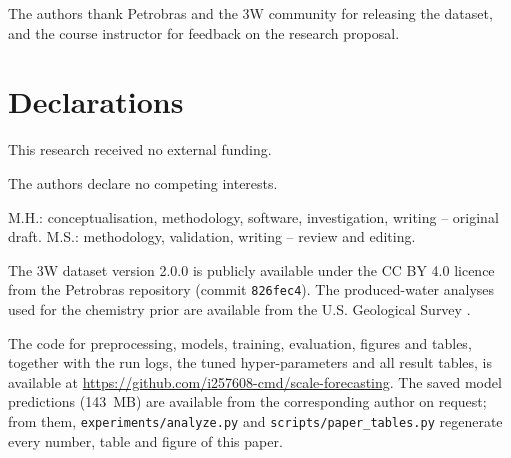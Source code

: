 The authors thank Petrobras and the 3W community for releasing the dataset, and the course instructor for
feedback on the research proposal.

\section*{Declarations}\label{sec:declarations}

This research received no external funding.

The authors declare no competing interests.

M.H.: conceptualisation, methodology, software, investigation, writing -- original draft. M.S.: methodology,
validation, writing -- review and editing.

The 3W dataset version 2.0.0 is publicly available under the CC BY 4.0 licence from the Petrobras repository
\citep{petrobras3w} (commit \texttt{826fec4}). The produced-water analyses used for the chemistry prior are
available from the U.S. Geological Survey \citep{blondes2023}.

The code for preprocessing, models, training, evaluation, figures and tables, together with the run logs, the
tuned hyper-parameters and all result tables, is available at
\url{https://github.com/i257608-cmd/scale-forecasting}. The saved model predictions (143~MB) are available
from the corresponding author on request; from them, \texttt{experiments/analyze.py} and
\texttt{scripts/paper\_tables.py} regenerate every number, table and figure of this paper.

